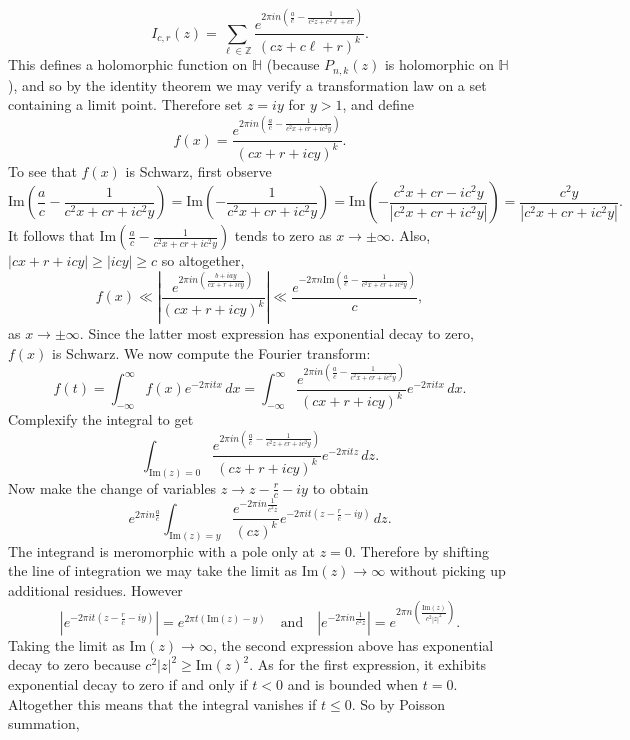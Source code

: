 \documentclass[12pt]{book}
\theoremstyle{definition}\newframedtheorem{method}{Method}
\newcommand{\Z}{\mathbb{Z}}
\renewcommand{\H}{\mathbb{H}}
\newcommand{\<}{\langle}
\renewcommand{\>}{\rangle}
\renewcommand{\Im}{\mathrm{Im}}
\begin{document}
      \[
        I_{c,r}(z) = \sum_{\ell \in \Z}\frac{e^{2\pi in\left(\frac{a}{c}-\frac{1}{c^{2}z+c^{2}\ell+cr}\right)}}{(cz+c\ell+r)^{k}}.
      \]
      This defines a holomorphic function on $\H$ (because $P_{n,k}(z)$ is holomorphic on $\H$), and so by the identity theorem we may verify a transformation law on a set containing a limit point. Therefore set $z = iy$ for $y > 1$, and define
      \[
        f(x) = \frac{e^{2\pi in\left(\frac{a}{c}-\frac{1}{c^{2}x+cr+ic^{2}y}\right)}}{(cx+r+icy)^{k}}.
      \]
      To see that $f(x)$ is Schwarz, first observe
      \[
        \Im\left(\frac{a}{c}-\frac{1}{c^{2}x+cr+ic^{2}y}\right) = \Im\left(-\frac{1}{c^{2}x+cr+ic^{2}y}\right) = \Im\left(-\frac{c^{2}x+cr-ic^{2}y}{|c^{2}x+cr+ic^{2}y|}\right) = \frac{c^{2}y}{|c^{2}x+cr+ic^{2}y|}.
      \]
      It follows that $\Im\left(\frac{a}{c}-\frac{1}{c^{2}x+cr+ic^{2}y}\right)$ tends to zero as $x \to \pm \infty$. Also, $|cx+r+icy| \ge |icy| \ge c$ so altogether,
      \[
        f(x) \ll \left|\frac{e^{2\pi in\left(\frac{b+iay}{cx+r+icy}\right)}}{(cx+r+icy)^{k}}\right| \ll \frac{e^{-2\pi n\Im\left(\frac{a}{c}-\frac{1}{c^{2}x+cr+ic^{2}y}\right)}}{c},
      \]
      as $x \to \pm\infty$. Since the latter most expression has exponential decay to zero, $f(x)$ is Schwarz. We now compute the Fourier transform:
      \[
        \hat{f}(t) = \int_{-\infty}^{\infty}f(x)e^{-2\pi itx}\,dx = \int_{-\infty}^{\infty}\frac{e^{2\pi in\left(\frac{a}{c}-\frac{1}{c^{2}x+cr+ic^{2}y}\right)}}{(cx+r+icy)^{k}}e^{-2\pi itx}\,dx.
      \]
      Complexify the integral to get
      \[
        \int_{\Im(z) = 0}\frac{e^{2\pi in\left(\frac{a}{c}-\frac{1}{c^{2}z+cr+ic^{2}y}\right)}}{(cz+r+icy)^{k}}e^{-2\pi itz}\,dz.
      \]
      Now make the change of variables $z \to z-\frac{r}{c}-iy$ to obtain
      \[
        e^{2\pi in\frac{a}{c}}\int_{\Im(z) = y}\frac{e^{-2\pi in\frac{1}{c^{2}z}}}{(cz)^{k}}e^{-2\pi it\left(z-\frac{r}{c}-iy\right)}\,dz.
      \]
      The integrand is meromorphic with a pole only at $z = 0$. Therefore by shifting the line of integration we may take the limit as $\Im(z) \to \infty$ without picking up additional residues. However
      \[
        \left|e^{-2\pi it\left(z-\frac{r}{c}-iy\right)}\right| = e^{2\pi t(\Im(z)-y)} \quad \text{and} \quad \left|e^{-2\pi in\frac{1}{c^{2}z}}\right| = e^{2\pi n\left(\frac{\Im(z)}{c^{2}|z|^{2}}\right)}.
      \]
      Taking the limit as $\Im(z) \to \infty$, the second expression above has exponential decay to zero because $c^{2}|z|^{2} \ge \Im(z)^{2}$. As for the first expression, it exhibits exponential decay to zero if and only if $t < 0$ and is bounded when $t = 0$. Altogether this means that the integral vanishes if $t \le 0$. So by Poisson summation,
\end{document}
